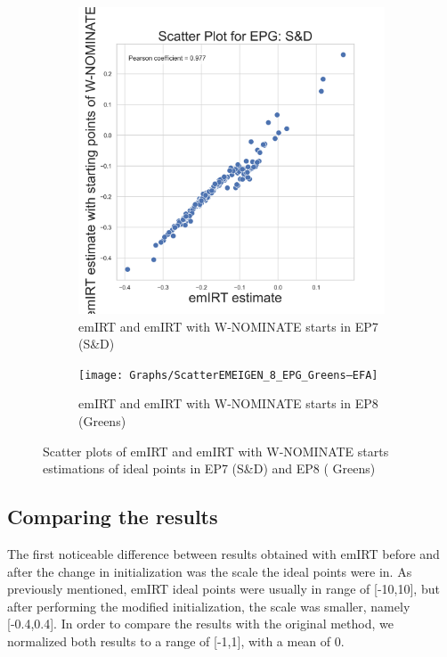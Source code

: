 \documentclass[a4paper,12pt]{report}
\begin{document}
    \begin{figure}[H]
        \centering
        \begin{subfigure}[b]{0.48\textwidth}
            \centering
            \includegraphics[width=\textwidth]{Graphs/ScatterEMEIGEN_7_EPG_S&D}
            \caption{emIRT and emIRT with W-NOMINATE starts in EP7 (S\&D)}
            \label{fig:EMEIGEN_SCATTER_7SD}
        \end{subfigure}
        \hfill
        \begin{subfigure}[b]{0.48\textwidth}
            \centering
            \texttt{[image: Graphs/ScatterEMEIGEN\_8\_EPG\_Greens–EFA]}
            \caption{emIRT and emIRT with W-NOMINATE starts in EP8 (Greens)}
            \label{fig:EMEIGEN_SCATTER_8Grens}
        \end{subfigure}
        \caption
        {Scatter plots of emIRT and emIRT with W-NOMINATE starts estimations of ideal points in EP7 (S\&D) and EP8 (
            Greens)}
        \label{fig:EMEIGEN_SCATTER_7_8SDGREENS}
    \end{figure}

    \subsection{Comparing the results}\label{subsec:comparing-the-results}
    The first noticeable difference between results obtained with emIRT before and after the change in
    initialization was the scale the ideal points were in.
    As previously mentioned, emIRT ideal points were usually
    in range of [-10,10], but after performing the modified initialization, the scale was smaller, namely [-0.4,0.4].
    In order to compare the results with the original method, we normalized both results to a range of [-1,1], with
    a mean of 0.
\end{document}
